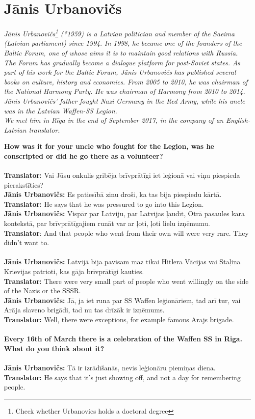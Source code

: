 \section{Jānis Urbanovičs}

\textit{Jānis Urbanovičs\footnote{Check whether Urbanovics holds a doctoral degree} (*1959) is a Latvian politician and member of the Saeima (Latvian parliament) since 1994. In 1998, he became one of the founders of the Baltic Forum, one of whose aims it is to maintain good relations with Russia. The Forum has gradually become a dialogue platform for post-Soviet states. As part of his work for the Baltic Forum, Jānis Urbanovičs has published several books on culture, history and economics. From 2005 to 2010, he was chairman of the National Harmony Party. He was chairman of Harmony from 2010 to 2014.\\
Jānis Urbanovičs’ father fought Nazi Germany in the Red Army, while his uncle was in the Latvian Waffen-SS Legion.\\
We met him in Rīga in the end of September 2017, in the company of an English-Latvian translator.}\par
\vspace*{2em}
\textbf{How was it for your uncle who fought for the Legion, was he conscripted or did he go there as a volunteer?}\\
\\
\textbf{Translator:} Vai Jūsu onkulis gribēja brīvprātīgi iet leģionā vai viņu piespieda pierakstīties?\\
\textbf{Jānis Urbanovičs:} Es patiesībā zinu droši, ka tas bija piespiedu kārtā.\\
\textbf{Translator:} He says that he was pressured to go into this Legion.\\
\textbf{Jānis Urbanovičs:} Vispār par Latviju, par Latvijas ļaudīt, Otrā pasaules kara kontekstā, par brīvprātīgajiem runāt var ar ļoti, ļoti lielu izņēmumu.\\
\textbf{Translator}: And that people who went from their own will were very rare. They didn’t want to.\\
\\
\textbf{Jānis Urbanovičs:} Latvijā bija pavisam maz tikai Hitlera Vācijas vai Staļina Krievijas patrioti, kas gāja brīvprātīgi kauties. \\
\textbf{Translator:} There were very small part of people who went willingly on the side of the Nazis or the SSSR.\\ 
\textbf{Jānis Urbanovičs:} Jā, ja iet runa par SS Waffen leģionāriem, tad arī tur, vai Arāja slaveno brigādi, tad nu tas drīzāk ir izņēmums.\\
\textbf{Translator:} Well, there were exceptions, for example famous Arajs brigade.\\
\\
\textbf{Every 16th of March there is a celebration of the Waffen SS in Riga. What do you think about it?} \\
\\
\textbf{Jānis Urbanovičs:} Tā ir izrādīšanās, nevis leģionāru piemiņas diena.\\
\textbf{Translator:} He says that it’s just showing off, and not a day for remembering people.

